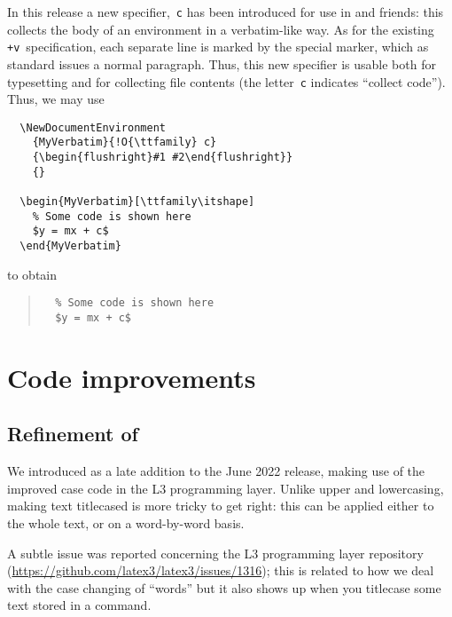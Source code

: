 \documentclass{ltnews}
\begin{document}
In this release a new specifier,~\texttt{c} has been introduced
for use
in  and friends:
this collects the body of an environment in a verbatim-like way. 
As for the
existing \texttt{+v}~specification, each separate line is marked by
the special  marker, which as standard issues a normal
paragraph. Thus, this new specifier is usable both for typesetting and
for collecting file contents (the letter~\texttt{c} indicates
\enquote{collect code}). 
Thus, we may use
\begin{verbatim}
  \NewDocumentEnvironment
    {MyVerbatim}{!O{\ttfamily} c}
    {\begin{flushright}#1 #2\end{flushright}}
    {}
    
  \begin{MyVerbatim}[\ttfamily\itshape]
    % Some code is shown here
    $y = mx + c$
  \end{MyVerbatim}
\end{verbatim}
to obtain
\begin{quote}
\makeatletter
\def\@verbatim{%
  \trivlist
  \raggedleft
  \let \do \@makeother
  \dospecials
  \obeylines
  \normalfont \ttfamily \itshape
  \@noligs
}
\begin{verbatim}
  % Some code is shown here
  $y = mx + c$
\end{verbatim}
\end{quote}



\section{Code improvements}

\subsection{Refinement of }

We introduced  as a late addition to the June 2022
release, making use of the improved case code in the L3 programming layer. Unlike
upper and lowercasing, making text titlecased is more tricky to get
right: this can be applied either
to the whole text, or on a word-by-word
basis.

A subtle issue was reported concerning the L3 programming layer repository
(\url{https://github.com/latex3/latex3/issues/1316}); this is related
to how we deal with the case changing of \enquote{words} but it also
shows up when you titlecase some text stored in a command.
\end{document}
